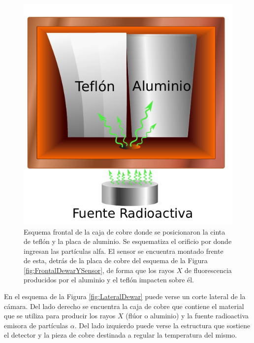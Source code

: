 \begin{figure}[h]
    \centering
    \includegraphics[scale=0.7]{Figs/CajaSensor.pdf}
    \caption{Esquema frontal de la caja de cobre donde se posicionaron la cinta de teflón y la placa de aluminio. Se esquematiza el orificio por donde ingresan las partículas alfa. El sensor se encuentra montado frente de esta, detrás de la placa de cobre del esquema de la Figura \ref{fig:FrontalDewarYSensor}, de forma que los rayos $X$ de fluorescencia producidos por el aluminio y el teflón impacten sobre él.}
    \label{fig:FrontalAlYF}
\end{figure}

En el esquema de la Figura \ref{fig:LateralDewar} puede verse un corte lateral de la cámara. Del lado derecho se encuentra la caja de cobre que contiene el material que se utiliza para producir los rayos $X$ (flúor o aluminio) y la fuente radioactiva emisora de partículas $\alpha$. 
Del lado izquierdo puede verse la estructura que sostiene el detector y la pieza de cobre destinada a regular la temperatura del mismo.

